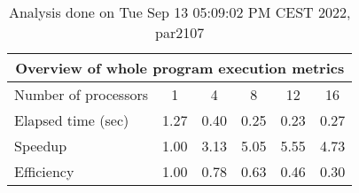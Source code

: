 \begin{table}[h]
\begin{center}
\begin{tabular}{|l|c|c|c|c|c|}
\hline
\multicolumn{6}{|c|}{Overview of whole program execution metrics} \\
\hline
\hline
Number of processors & 1 & 4 & 8 & 12 & 16 \\
\hline
Elapsed time (sec)      &       1.27 &       0.40 &       0.25 &       0.23 &       0.27 \\
\hline
Speedup                 &       1.00 &       3.13 &       5.05 &       5.55 &       4.73 \\
\hline
Efficiency              &       1.00 &       0.78 &       0.63 &       0.46 &       0.30 \\
\hline
\end{tabular}
\end{center}
\caption{ Analysis done on Tue Sep 13 05:09:02 PM CEST 2022, par2107}
\end{table}
